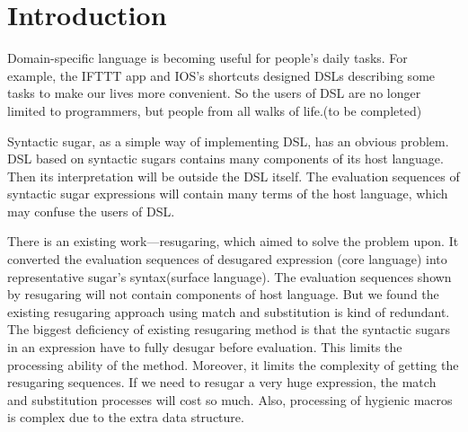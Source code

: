 \section{Introduction}







Domain-specific language\cite{dsl} is becoming useful for people's daily tasks. For example, the IFTTT app and IOS's shortcuts designed DSLs describing some tasks to make our lives more convenient. So the users of DSL are no longer limited to programmers, but people from all walks of life.(to be completed)

Syntactic sugar\cite{syntacticsugar}, as a simple way of implementing DSL, has an obvious problem. DSL based on syntactic sugars contains many components of its host language. Then its interpretation will be outside the DSL itself. The evaluation sequences of syntactic sugar expressions will contain many terms of the host language, which may confuse the users of DSL.

There is an existing work---resugaring\cite{resugaring}\cite{hygienic}, which aimed to solve the problem upon. It converted the evaluation sequences of desugared expression (core language) into representative sugar's syntax(surface language). The evaluation sequences shown by resugaring will not contain components of host language. But we found the existing resugaring approach using match and substitution is kind of redundant. The biggest deficiency of existing resugaring method is that the syntactic sugars in an expression have to fully desugar before evaluation. This limits the processing ability of the method. Moreover, it limits the complexity of getting the resugaring sequences. If we need to resugar a very huge expression, the match and substitution processes will cost so much. Also, processing of hygienic macros is complex due to the extra data structure.



